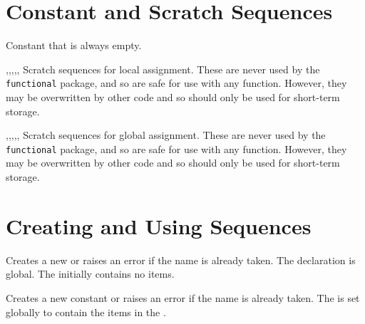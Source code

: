 \documentclass[oneside]{book}
\begin{document}
\section{Constant and Scratch Sequences}

\begin{variable}{\cEmptySeq}
Constant that is always empty.
\end{variable}

\begin{variable}{\lTmpaSeq,\lTmpbSeq,\lTmpcSeq,\lTmpiSeq,\lTmpjSeq,\lTmpkSeq}
Scratch sequences for local assignment. These are never used by
the \verb!functional! package, and so are safe for use with any
function. However, they may be overwritten by other
code and so should only be used for short-term storage.
\end{variable}

\begin{variable}{\gTmpaSeq,\gTmpbSeq,\gTmpcSeq,\gTmpiSeq,\gTmpjSeq,\gTmpkSeq}
Scratch sequences for global assignment. These are never used by
the \verb!functional! package, and so are safe for use with any
function. However, they may be overwritten by other
code and so should only be used for short-term storage.
\end{variable}

\section{Creating and Using Sequences}

\begin{function}{\seqNew}
\begin{syntax}
 
\end{syntax}
Creates a new  or raises an error if the name is
already taken. The declaration is global. The 
initially contains no items.
\begin{codehigh}
\seqNew \lFooSomeSeq
\end{codehigh}
\end{function}

\begin{function}{\seqConstFromClist}
\begin{syntax}
  
\end{syntax}
Creates a new constant  or raises an error if the name
is already taken. The  is set globally to contain the
items in the .
\begin{codehigh}
\seqConstFromClist {}
\end{codehigh}
\end{function}
\end{document}
